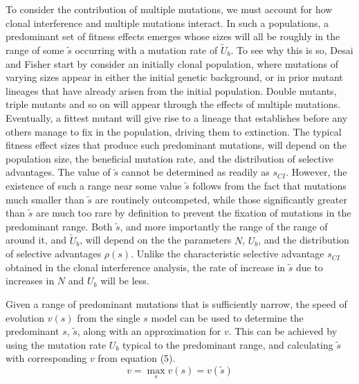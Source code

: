 \documentclass[12pt, one column]{article}
\begin{document}
To consider the contribution of multiple mutations, we must account for how clonal interference and multiple mutations interact.  In such a populations, a predominant set of fitness effects emerges whose sizes will all be roughly in the range of some $\tilde{s}$ occurring with a mutation rate of $\tilde{U}_b$.  To see why this is so, Desai and Fisher start by consider an initially clonal population, where mutations of varying sizes appear in either the initial genetic background, or in prior mutant lineages that have already arisen from the initial population. Double mutants, triple mutants and so on will appear through the effects of multiple mutations.  Eventually, a fittest mutant will give rise to a lineage that establishes before any others manage to fix in the population, driving them to extinction.  The typical fitness effect sizes that produce such predominant mutations, will depend on the population size, the beneficial mutation rate, and the distribution of selective advantages.  The value of $\tilde{s}$ cannot be determined as readily as $s_{CI}$.  However, the existence of such a range near some value $\tilde{s}$ follows from the fact that mutations much smaller than $\tilde{s}$ are routinely outcompeted, while those significantly greater than $\tilde{s}$ are much too rare by definition to prevent the fixation of mutations in the predominant range.  Both $\tilde{s}$, and more importantly the range of the range of around it, and $\tilde{U}_b$, will depend on the the parameters $N$, $U_b$, and the distribution of selective advantages $\rho(s)$.  Unlike the characteristic selective advantage $s_{CI}$ obtained in the clonal interference analysis, the rate of increase in $\tilde{s}$ due to increases in $N$ and $U_b$ will be less.

Given a range of predominant mutations that is sufficiently narrow, the speed of evolution $v(s)$ from the single $s$ model can be used to determine the predominant $s$, $\tilde{s}$, along with an approximation for $v$.  This can be achieved by using the mutation rate $U_b$ typical to the predominant range, and calculating $\tilde{s}$ with corresponding $v$ from equation (5).
\begin{equation}
v = \max_{s} v(s)=v(\tilde{s})
\end{equation}
\end{document}
